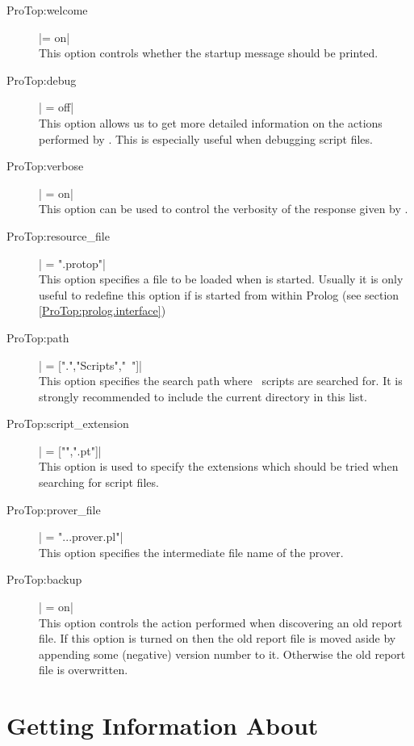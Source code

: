 \begin{description}
  \item [ProTop:welcome] |= on|
    \\
    This option controls whether the startup message should be printed.
  \item [ProTop:debug] | = off|
    \\
    This option allows us to get more detailed information on the actions
    performed by \ProTop. This is especially useful when debugging script
    files.
  \item [ProTop:verbose] | = on|
    \\
    This option can be used to control the verbosity of the response given by
    \ProCom.
  \item [ProTop:resource\_file] | = ".protop"|
    \\
    This option specifies a file to be loaded when \ProTop{} is started.
    Usually it is only useful to redefine this option if \ProTop{} is started
    from within Prolog (see section \ref{ProTop:prolog.interface})
  \item [ProTop:path] | = [".","Scripts","~"]|
    \\
    This option specifies the search path where \ProTop\ scripts are searched
    for. It is strongly recommended to include the current directory in this
    list.
  \item [ProTop:script\_extension] | = ["",".pt"]|
    \\
    This option is used to specify the extensions which should be tried when
    searching for \ProTop{} script files.
  \item [ProTop:prover\_file] | = "...prover.pl"|
    \\
    This option specifies the intermediate file name of the prover.
  \item [ProTop:backup] | = on|\label{ProTop:backup}
    \\
    This option controls the action performed when discovering an old report
    file. If this option is turned on then the old report file is moved aside
    by appending some (negative) version number to it. Otherwise the old
    report file is overwritten.
\end{description}

\section{Getting Information About \ProTop}

